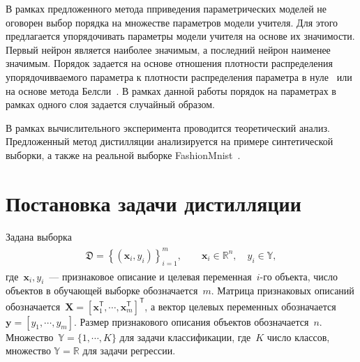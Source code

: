 \documentclass[12pt]{a&t}
\begin{document}
В рамках предложенного метода пприведения параметрических моделей не оговорен выбор порядка на множестве параметров модели учителя.
Для этого предлагается упорядочивать параметры модели учителя на основе их значимости.
Первый нейрон является наиболее значимым, а последний нейрон наименее значимым.
Порядок задается на основе отношения плотности распределения упорядочивваемого параметра к плотности распределения параметра в нуле~\cite{graves2011} или на основе метода Белсли~\cite{grabovoy2019}.
В рамках данной работы порядок на параметрах в рамках одного слоя задается случайный образом.

В рамках вычислительного эксперимента проводится теоретический анализ. Предложенный метод дистилляции анализируется на примере синтетической выборки, а также на реальной выборке FashionMnist~\cite{fashionmnist}.

\section{Постановка задачи дистилляции}
Задана выборка
\begin{gather}
\label{eq:st:1}
\begin{aligned}
\mathfrak{D} = \left\{\left(\mathbf{x}_i, y_i\right)\right\}_{i=1}^{m}, \qquad \mathbf{x}_i \in \mathbb{R}^{n}, \quad y_i \in \mathbb{Y},
\end{aligned}
\end{gather}
где~$\mathbf{x}_i, y_i$~--- признаковое описание и целевая переменная~$i$-го объекта, число объектов в обучающей выборке обозначается~$m$. Матрица признаковых описаний обозначается~$\mathbf{X}=\left[\mathbf{x}_1^{\mathsf{T}}, \cdots, \mathbf{x}_m^{\mathsf{T}}\right]^{\mathsf{T}}$, а вектор целевых переменных обозначается~$\mathbf{y}=\left[y_1, \cdots, y_m\right]$. Размер признакового описания объектов обозначается~$n$. Множество~$\mathbb{Y}=\{1,\cdots,K\}$ для задачи классификации, где~$K$ число классов, множество $\mathbb{Y}=\mathbb{R}$ для задачи регрессии.
\end{document}
